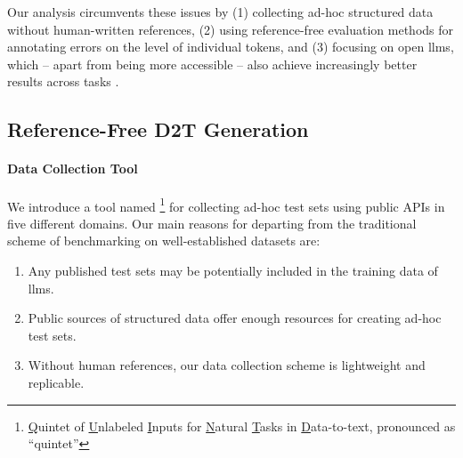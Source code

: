Our analysis circumvents these issues by (1) collecting ad-hoc structured data without human-written references, (2) using reference-free evaluation methods for annotating errors on the level of individual tokens, and (3) focusing on open \acp{llm}, which -- apart from being more accessible -- also achieve increasingly better results across tasks \cite{zheng2023judging,open-llm-leaderboard}.








\subsection{Reference-Free D2T Generation}
\label{sec:quintd:data}

\paragraph{Data Collection Tool}
\label{sec:quintd:data_collection}
We introduce a tool named \datatool\footnote{\underline{Q}uintet of \underline{U}nlabeled \underline{I}nputs for \underline{N}atural \underline{T}asks in \underline{D}ata-to-text, pronounced as ``quintet''} for collecting ad-hoc test sets using public APIs in five different domains.
Our main reasons for departing from the traditional scheme of benchmarking on well-established datasets are:
\begin{enumerate}
    \item Any published test sets may be potentially included in the training data of \acp{llm}.
    \item Public sources of structured data offer enough resources for creating ad-hoc test sets.
    \item Without human references, our data collection scheme is lightweight and replicable.
\end{enumerate}

